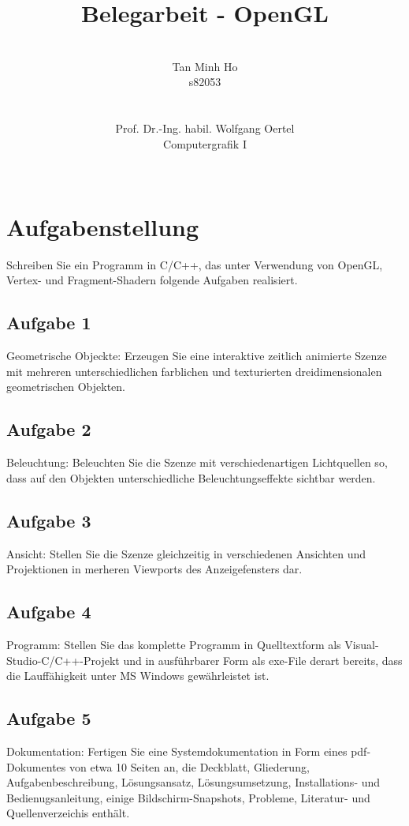 \documentclass[12pt]{article}
\author{\\ Tan Minh Ho \\ s82053 \\ \\ \\ Prof. Dr.-Ing. habil. Wolfgang Oertel \\ Computergrafik I\\ \\ }
\title{Belegarbeit - OpenGL}
\begin{document}
\maketitle 

\pagebreak
{
\hypersetup{linkcolor=black}
\tableofcontents
}

\pagebreak

\section{Aufgabenstellung}

Schreiben Sie ein Programm in C/C++, das unter Verwendung von OpenGL, Vertex- und Fragment-Shadern folgende Aufgaben realisiert. \\

\subsection{Aufgabe 1}
Geometrische Objeckte: Erzeugen Sie eine interaktive zeitlich animierte Szenze mit mehreren unterschiedlichen farblichen und texturierten dreidimensionalen geometrischen Objekten. \\
\subsection{Aufgabe 2}
Beleuchtung: Beleuchten Sie die Szenze mit verschiedenartigen Lichtquellen so, dass auf den Objekten unterschiedliche Beleuchtungseffekte sichtbar werden. \\
\subsection{Aufgabe 3}
Ansicht: Stellen Sie die Szenze gleichzeitig in verschiedenen Ansichten und Projektionen in merheren Viewports des Anzeigefensters dar. \\
\subsection{Aufgabe 4}
Programm: Stellen Sie das komplette Programm in Quelltextform als Visual-Studio-C/C++-Projekt und in ausführbarer Form als exe-File derart bereits, dass die Lauffähigkeit unter MS Windows gewährleistet ist.\\
\subsection{Aufgabe 5}
Dokumentation: Fertigen Sie eine Systemdokumentation in Form eines pdf-Dokumentes von etwa 10 Seiten an, die Deckblatt, Gliederung, Aufgabenbeschreibung, Lösungsansatz, Lösungsumsetzung, Installations- und Bedienugsanleitung,
einige Bildschirm-Snapshots, Probleme, Literatur- und Quellenverzeichis enthält. \\
\end{document}
